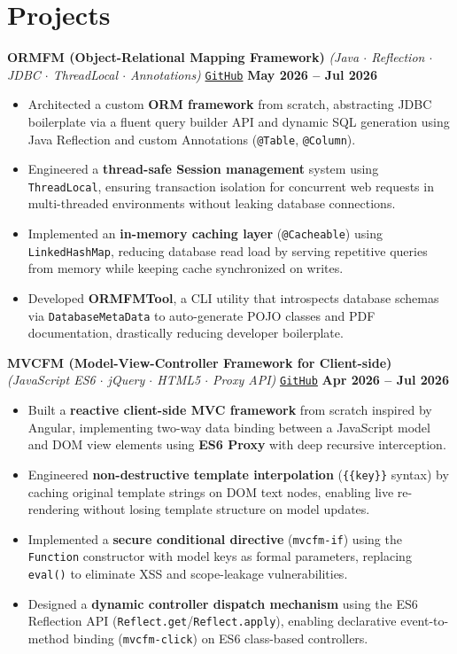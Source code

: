 \documentclass[a4paper,10pt]{article}
\begin{document}
\section*{Projects}

\textbf{ORMFM (Object-Relational Mapping Framework)} \textit{(Java $\cdot$ Reflection $\cdot$ JDBC $\cdot$ ThreadLocal $\cdot$ Annotations)}
\hfill \href{https://github.com/ashvin-parmar/orm-fm}{\texttt{GitHub}} \quad \textbf{May 2026 -- Jul 2026}
\begin{itemize}
  \item Architected a custom \textbf{ORM framework} from scratch, abstracting JDBC boilerplate via a fluent query builder API and dynamic SQL generation using Java Reflection and custom Annotations (\texttt{@Table}, \texttt{@Column}).
  \item Engineered a \textbf{thread-safe Session management} system using \texttt{ThreadLocal}, ensuring transaction isolation for concurrent web requests in multi-threaded environments without leaking database connections.
  \item Implemented an \textbf{in-memory caching layer} (\texttt{@Cacheable}) using \texttt{LinkedHashMap}, reducing database read load by serving repetitive queries from memory while keeping cache synchronized on writes.
  \item Developed \textbf{ORMFMTool}, a CLI utility that introspects database schemas via \texttt{DatabaseMetaData} to auto-generate POJO classes and PDF documentation, drastically reducing developer boilerplate.
\end{itemize}

\vspace{0.5mm}

\textbf{MVCFM (Model-View-Controller Framework for Client-side)} \textit{(JavaScript ES6 $\cdot$ jQuery $\cdot$ HTML5 $\cdot$ Proxy API)}
\hfill \href{https://github.com/ashvin-parmar/mvcfm}{\texttt{GitHub}} \quad \textbf{Apr 2026 -- Jul 2026}
\begin{itemize}
  \item Built a \textbf{reactive client-side MVC framework} from scratch inspired by Angular, implementing two-way data binding between a JavaScript model and DOM view elements using \textbf{ES6 Proxy} with deep recursive interception.
  \item Engineered \textbf{non-destructive template interpolation} (\texttt{\{\{key\}\}} syntax) by caching original template strings on DOM text nodes, enabling live re-rendering without losing template structure on model updates.
  \item Implemented a \textbf{secure conditional directive} (\texttt{mvcfm-if}) using the \texttt{Function} constructor with model keys as formal parameters, replacing \texttt{eval()} to eliminate XSS and scope-leakage vulnerabilities.
  \item Designed a \textbf{dynamic controller dispatch mechanism} using the ES6 Reflection API (\texttt{Reflect.get}/\texttt{Reflect.apply}), enabling declarative event-to-method binding (\texttt{mvcfm-click}) on ES6 class-based controllers.
\end{itemize}
\end{document}
